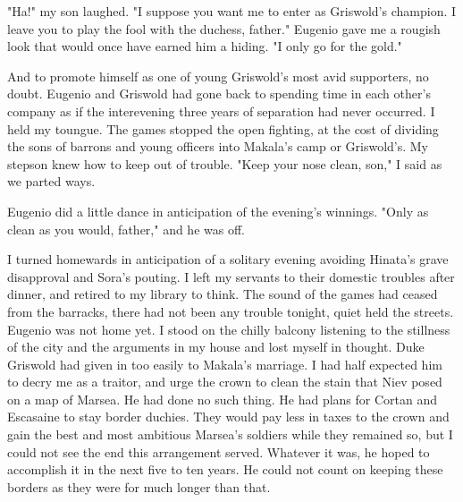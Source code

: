 \documentclass{article}
\begin{document}
"Ha!" my son laughed. "I suppose you want me to enter as Griswold's champion. I leave you to play the fool with the duchess, father." Eugenio gave me a rougish look that would once have earned him a hiding. "I only go for the gold."

And to promote himself as one of young Griswold's most avid supporters, no doubt. Eugenio and Griswold had gone back to spending time in each other's company as if the interevening three years of separation had never occurred. I held my toungue. The games stopped the open fighting, at the cost of dividing the sons of barrons and young officers into Makala's camp or Griswold's. My stepson knew how to keep out of trouble. "Keep your nose clean, son," I said as we parted ways.

Eugenio did a little dance in anticipation of the evening's winnings. "Only as clean as you would, father," and he was off.

I turned homewards in anticipation of a solitary evening avoiding Hinata's grave disapproval and Sora's pouting. I left my servants to their domestic troubles after dinner, and retired to my library to think. The sound of the games had ceased from the barracks, there had not been any trouble tonight, quiet held the streets. Eugenio was not home yet. I stood on the chilly balcony listening to the stillness of the city and the arguments in my house and lost myself in thought. Duke Griswold had given in too easily to Makala's marriage. I had half expected him to decry me as a traitor, and urge the crown to clean the stain that Niev posed on a map of Marsea. He had done no such thing. He had plans for Cortan and Escasaine to stay border duchies. They would pay less in taxes to the crown and gain the best and most ambitious Marsea's soldiers while they remained so, but I could not see the end this arrangement served. Whatever it was, he hoped to accomplish it in the next five to ten years. He could not count on keeping these borders as they were for much longer than that. 
\end{document}
